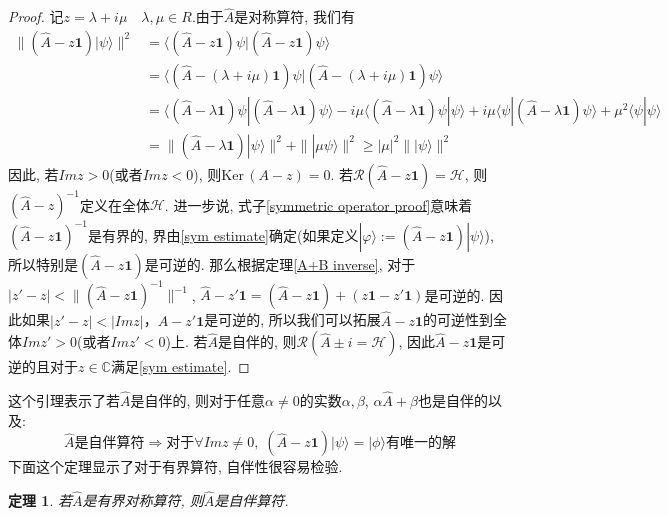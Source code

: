\documentclass[a4paper,11pt]{article}
\newtheorem{theorem}{\hspace{2em}定理}[section]
\newtheorem{proof}{证明}[section]
\begin{document}
\begin{proof}
  记$z=\lambda+i\mu\quad\lambda,\mu\in R$.由于$\hat{A}$是对称算符, 我们有
\begin{equation}\label{symmetric operator proof}
  \begin{split}
     \|(\hat{A}-z\mathbf{1})|\psi\rangle\|^2 & =\langle(\hat{A}-z\mathbf{1})\psi|(\hat{A}-z\mathbf{1})\psi\rangle \\
       & =\langle(\hat{A}-(\lambda+i\mu)\mathbf{1})\psi|(\hat{A}-(\lambda+i\mu)\mathbf{1})\psi\rangle \\
       & =\langle(\hat{A}-\lambda\mathbf{1})\psi|(\hat{A}-\lambda\mathbf{1})\psi\rangle-i\mu\langle(\hat{A}-\lambda\mathbf{1})\psi|\psi\rangle+i\mu\langle\psi|(\hat{A}-\lambda\mathbf{1})\psi\rangle+\mu^2\langle\psi|\psi\rangle\\
       & =\|(\hat{A}-\lambda\mathbf{1})|\psi\rangle\|^2+\||\mu\psi\rangle\|^2\geq|\mu|^2\||\psi\rangle\|^2
  \end{split}
\end{equation}
因此, 若$Im z>0$(或者$Imz<0$), 则$\mathrm{Ker}\,(A-z)={0}$. 若$\mathcal{R}(\hat{A}-z\mathbf{1})=\mathcal{H}$, 则$(\hat{A}-z)^{-1}$定义在全体$\mathcal{H}$. 进一步说, 式子\eqref{symmetric operator proof}意味着$(\hat{A}-z\mathbf{1})^{-1}$是有界的, 界由\eqref{sym estimate}确定(如果定义$|\varphi\rangle:=(\hat{A}-z\mathbf{1})|\psi\rangle$), 所以特别是$(\hat{A}-z\mathbf{1})$是可逆的. 那么根据定理\ref{A+B inverse}, 对于$|z'-z|<\|(\hat{A}-z\mathbf{1})^{-1}\|^{-1}$, $\hat{A}-z'\mathbf{1}=(\hat{A}-z\mathbf{1})+(z\mathbf{1}-z'\mathbf{1})$是可逆的. 因此如果$|z'-z|<|Im z|$，$A-z'\mathbf{1}$是可逆的, 所以我们可以拓展$\hat{A}-z\mathbf{1}$的可逆性到全体$Im z'>0$(或者$Imz'<0$)上. 若$\hat{A}$是自伴的, 则$\mathcal{R}(\hat{A}\pm i=\mathcal{H})$, 因此$\hat{A}-z\mathbf{1}$是可逆的且对于$z\in\mathbb{C}$满足\ref{sym estimate}.
\end{proof}
这个引理表示了若$\hat{A}$是自伴的, 则对于任意$\alpha\neq0$的实数$\alpha,\beta$, $\alpha\hat{A}+\beta$也是自伴的以及:
\begin{equation*}
  \text{$\hat{A}$是自伴算符}\Rightarrow\text{对于$\forall Im z\neq0$},\; (\hat{A}-z\mathbf{1})|\psi\rangle=|\phi\rangle\text{有唯一的解}
\end{equation*}
下面这个定理显示了对于有界算符, 自伴性很容易检验.
\begin{theorem}
  若$\hat{A}$是有界对称算符, 则$\hat{A}$是自伴算符.
\end{theorem}
\end{document}
